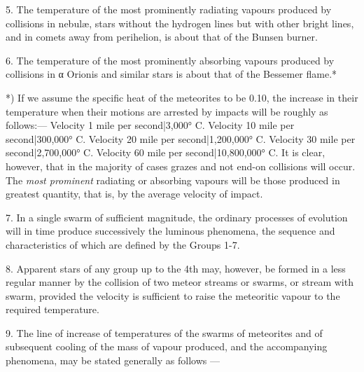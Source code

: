 \documentclass[a4paper, 12pt, oneside, polutonikogreek, english]{article}
\begin{document}
5. The temperature of the most prominently radiating vapours produced by collisions in nebulæ, stars without the hydrogen lines but with other bright lines, and in comets away from perihelion, is about that of the Bunsen burner.

6. The temperature of the most prominently absorbing vapours produced by collisions in α Orionis and similar stars is about that of the Bessemer flame.*

*) If we assume the specific heat of the meteorites to be 0.10, the increase in their temperature when their motions are arrested by impacts will be roughly as follows:--- Velocity 1 mile per second|3,000° C. Velocity 10 mile per second|300,000° C. Velocity 20 mile per second|1,200,000° C. Velocity 30 mile per second|2,700,000° C. Velocity 60 mile per second|10,800,000° C. It is clear, however, that in the majority of cases grazes and not end-on collisions will occur. The \emph{most prominent} radiating or absorbing vapours will be those produced in greatest quantity, that is, by the average velocity of impact.

7. In a single swarm of sufficient magnitude, the ordinary processes of evolution will in time produce successively the luminous phenomena, the sequence and characteristics of which are defined by the Groups 1-7.

8. Apparent stars of any group up to the 4th may, however, be formed in a less regular manner by the collision of two meteor streams or swarms, or stream with swarm, provided the velocity is sufficient to raise the meteoritic vapour to the required temperature.

9. The line of increase of temperatures of the swarms of meteorites and of subsequent cooling of the mass of vapour produced, and the accompanying phenomena, may be stated generally as follows ---
\end{document}
